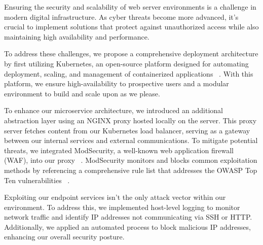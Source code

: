 Ensuring the security and scalability of web server environments is a challenge in modern digital infrastructure. 
As cyber threats become more advanced, it's crucial to implement solutions that protect against unauthorized access 
while also maintaining high availability and performance. 

To address these challenges, we propose a comprehensive deployment architecture by first utilizing Kubernetes, an open-source platform designed for automating deployment, scaling, 
and management of containerized applications ~\cite{kubernetes}. With this platform, we ensure high-availability to prospective users and a modular
environment to build and scale upon as we please. 

To enhance our microservice architecture, we introduced an additional abstraction layer using an NGINX proxy hosted locally on the server. 
This proxy server fetches content from our Kubernetes load balancer, serving as a gateway between our internal services and external communications. 
To mitigate potential threats, we integrated ModSecurity, a well-known web application firewall (WAF), into our proxy ~\cite{modsecurity}. 
ModSecurity monitors and blocks common exploitation methods by referencing a comprehensive rule list that addresses the OWASP Top Ten vulnerabilities ~\cite{owasp_top_ten}.

Exploiting our endpoint services isn't the only attack vector within our environment. 
To address this, we implemented host-level logging to monitor network traffic and identify IP addresses not communicating via SSH or HTTP. 
Additionally, we applied an automated process to block malicious IP addresses, enhancing our overall security posture.

